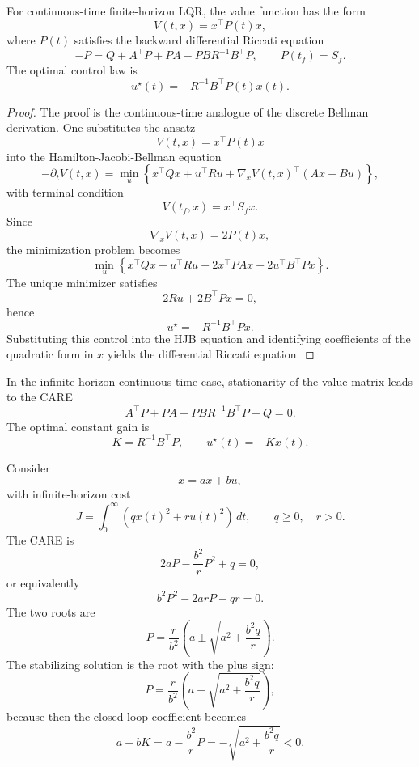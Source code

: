 \begin{theorem}\label{thm:l6-differential-riccati-equation}
	For continuous-time finite-horizon LQR, the value function has the form
	\[
		V(t,x)=x^\top P(t)x,
	\]
	where $P(t)$ satisfies the backward differential Riccati equation
	\[
		-\dot P
		=
		Q + A^\top P + P A - P B R^{-1}B^\top P,
		\qquad
		P(t_f)=S_f.
	\]
	The optimal control law is
	\[
		u^\star(t)=-R^{-1}B^\top P(t)x(t).
	\]
\end{theorem}
\begin{proof}
	The proof is the continuous-time analogue of the discrete Bellman derivation. One substitutes the ansatz
	\[
		V(t,x)=x^\top P(t)x
	\]
	into the Hamilton-Jacobi-Bellman equation
	\[
		-\partial_t V(t,x)
		=
		\min_u
		\left\{
		x^\top Q x + u^\top R u + \nabla_x V(t,x)^\top(Ax+Bu)
		\right\},
	\]
	with terminal condition
	\[
		V(t_f,x)=x^\top S_f x.
	\]
	Since
	\[
		\nabla_x V(t,x)=2P(t)x,
	\]
	the minimization problem becomes
	\[
		\min_u
		\left\{
		x^\top Qx + u^\top Ru + 2x^\top P A x + 2u^\top B^\top P x
		\right\}.
	\]
	The unique minimizer satisfies
	\[
		2Ru + 2B^\top Px = 0,
	\]
	hence
	\[
		u^\star=-R^{-1}B^\top Px.
	\]
	Substituting this control into the HJB equation and identifying coefficients of the quadratic form in $x$ yields the differential Riccati equation.
\end{proof}

\begin{definition}\label{def:l6-continuous-time-algebraic-riccati-equation}
	In the infinite-horizon continuous-time case, stationarity of the value matrix leads to the CARE
	\[
		A^\top P + P A - P B R^{-1}B^\top P + Q = 0.
	\]
	The optimal constant gain is
	\[
		K=R^{-1}B^\top P,
		\qquad
		u^\star(t)=-Kx(t).
	\]
\end{definition}

\begin{eg}
	Consider
	\[
		\dot x = ax + bu,
	\]
	with infinite-horizon cost
	\[
		J=\int_0^\infty \left(qx(t)^2 + ru(t)^2\right)\,dt,
		\qquad
		q \ge 0,
		\quad
		r>0.
	\]
	The CARE is
	\[
		2aP - \frac{b^2}{r}P^2 + q = 0,
	\]
	or equivalently
	\[
		b^2P^2 - 2arP - qr = 0.
	\]
	The two roots are
	\[
		P=\frac{r}{b^2}\left(a \pm \sqrt{a^2+\frac{b^2 q}{r}}\right).
	\]
	The stabilizing solution is the root with the plus sign:
	\[
		P=\frac{r}{b^2}\left(a + \sqrt{a^2+\frac{b^2 q}{r}}\right),
	\]
	because then the closed-loop coefficient becomes
	\[
		a-bK
		=
		a-\frac{b^2}{r}P
		=
		-\sqrt{a^2+\frac{b^2 q}{r}} < 0.
	\]
\end{eg}


